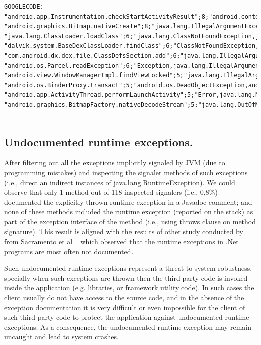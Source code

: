 \documentclass[conference]{IEEEtran}
\begin{document}
{\begin{verbatim}
GOOGLECODE:
"android.app.Instrumentation.checkStartActivityResult";8;"android.content.ActivityNotFoundException"
"android.graphics.Bitmap.nativeCreate";8;"java.lang.IllegalArgumentException,java.lang.OutOfMemoryError,java.lang.RuntimeException"
"java.lang.ClassLoader.loadClass";6;"java.lang.ClassNotFoundException,java.lang.IncompatibleClassChangeError,java.lang.UnsupportedClassVersionError"
"dalvik.system.BaseDexClassLoader.findClass";6;"ClassNotFoundException,java.lang.ClassNotFoundException"
"com.android.dx.dex.file.ClassDefsSection.add";6;"java.lang.IllegalArgumentException"
"android.os.Parcel.readException";6;"Exception,java.lang.IllegalArgumentException,java.lang.IllegalStateException,java.lang.NullPointerException,java.lang.SecurityException"
"android.view.WindowManagerImpl.findViewLocked";5;"java.lang.IllegalArgumentException"
"android.os.BinderProxy.transact";5;"android.os.DeadObjectException,android.os.RemoteException,android.os.TransactionTooLargeException,java.lang.RuntimeException,java.lang.SecurityException"
"android.app.ActivityThread.performLaunchActivity";5;"Error,java.lang.NullPointerException,java.lang.RuntimeException"
"android.graphics.BitmapFactory.nativeDecodeStream";5;"java.lang.OutOfMemoryError"


\end{verbatim}
}

\subsection{Undocumented runtime exceptions.} After filtering out all the exceptions implicitly 
signaled by  JVM (due to programming mistakes) and inspecting the signaler methods of such exceptions (i.e.,  direct an indirect 
instances of java.lang.RuntimeException). We could observe that only 1 method out of 118 inspected signalers
 (i.e., 0,8\%) documented the explicitly thrown runtime exception in a Javadoc comment; and none of these methods
included the runtime exception  (reported on the stack) as part of the exception interface of the method (i.e., using 
throws clause on method signature). This result is aligned with the results of other  study conducted by from 
Sacramento et al ~\cite{sacramento2006unchecked} which observed that the
runtime exceptions in .Net programs are most often not documented.

Such undocumented runtime exceptions represent a threat to system robustness, specially
when such exceptions are thrown then the third party code is invoked inside the application (e.g. libraries, or framework utility code).
In such cases the client usually do not have access to the source code, and in the absence of
the exception documentation it is very difficult or even impossible for the client of such third party code to 
protect the application against undocumented runtime exceptions. As a consequence, the
 undocumented runtime exception may remain uncaught and lead to system crashes.
\end{document}
